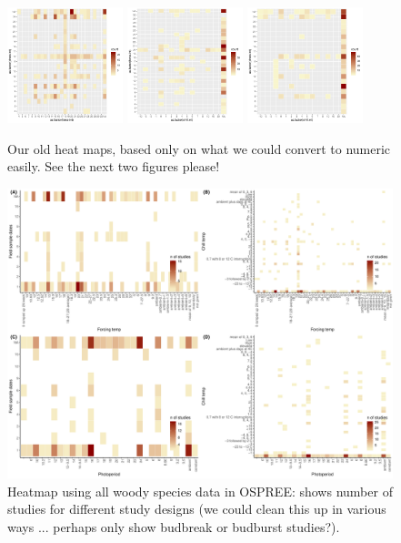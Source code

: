\documentclass[11pt,letter]{article}
\begin{document}
\begin{figure}[t!]
\centering
\includegraphics[width=0.3\textwidth]{..//..//analyses/limitingcues/figures/heatmapforcexphoto.pdf}
\includegraphics[width=0.3\textwidth]{..//..//analyses/limitingcues/figures/heatmapchillxforce.pdf}
\includegraphics[width=0.3\textwidth]{..//..//analyses/limitingcues/figures/heatmapchillxphoto.pdf}
\caption{Our old heat maps, based only on what we could convert to numeric easily. See the next two figures please!}
  \label{fig:heatmaps}
\end{figure}
\clearpage


\begin{figure}[t!]
\centering
\includegraphics[width=1\textwidth]{..//..//analyses/limitingcues/figures/heatallosp_4panel.pdf}
\caption{Heatmap using all woody species data in OSPREE: shows number of studies for different study designs (we could clean this up in various ways ... perhaps only show budbreak or budburst studies?).}
  \label{fig:heatmap4p}
\end{figure}
\end{document}
